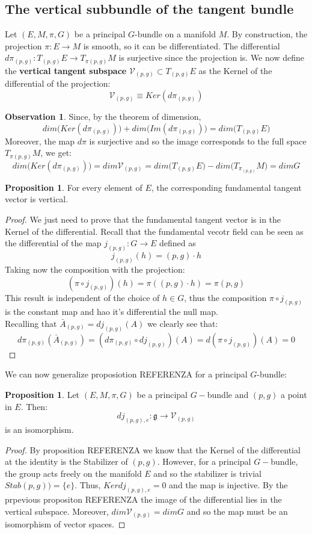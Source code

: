 \documentclass[12pt,a4paper]{report}
\theoremstyle{definition}
\theoremstyle{Theorem}
\newtheorem{Prop}[Def]{Proposition}
\theoremstyle{definition}
\theoremstyle{definition}
\newtheorem{Obs}[Def]{Observation}
\begin{document}
		\subsection{The vertical subbundle of the tangent bundle}
		Let $(E,M,\pi,G)$ be a principal $G$-bundle on a manifold $M$. By construction, the projection $\pi:E\rightarrow M$ is smooth, so it can be differentiated. The differential $d\pi_{(p,g)}:T_{(p,g)}E\rightarrow T_{\pi(p,g)}M$ is surjective since the projection is. We now define the \textbf{vertical tangent subspace} $\mathcal{V}_{(p,g)}\subset T_{(p,g)}E$ as the Kernel of the differential of the projection:
		$$\mathcal{V}_{(p,g)}\equiv Ker(d\pi_{(p,g)})$$
		\begin{Obs}
			Since, by the theorem of dimension, 
			$$dim \bigg(Ker(d\pi_{(p,g)})\bigg)+dim\bigg(Im(d\pi_{(p,g)})\bigg)=dim\bigg(T_{(p,g)}E\bigg)$$
			Moreover, the map $d\pi$ is surjective and so the image corresponds to the full space $T_{\pi(p,g)}M$, we get:
			$$dim \bigg(Ker(d\pi_{(p,g)})\bigg)=dim\mathcal{V}_{(p,g)}=dim\bigg(T_{(p,g)}E\bigg)-dim\bigg(T_{\pi_{(p,g)}}M\bigg)=dim G$$
		\end{Obs}
		\begin{Prop}
			For every element of $E$, the corresponding fundamental tangent vector is vertical.
		\end{Prop}
		\begin{proof}
			We just need to prove that the fundamental tangent vector is in the Kernel of the differential. Recall that the fundamental vecotr field can be seen as the differential of the map $j_{(p,g)}:G\rightarrow E$ defined as 
			$$j_{(p,g)}(h)=(p,g)\cdot h $$
			Taking now the composition with the projection:
			$$(\pi\circ j_{(p,g)})(h)=\pi((p,g)\cdot h)=\pi(p,g)$$
			This result is independent of the choice of $h\in G$, thus the composition $\pi\circ j_{(p,g)}$ is the constant map and hao it's differential the null map.\\
			Recalling that $\bar{A}_{(p,g)}=dj_{(p,g)}(A)$ we clearly see that:
			$$d\pi_{(p,g)}(\bar{A}_{(p,g)})=
			(d\pi_{(p,g)}\circ dj_{(p,g)})(A)=
			d(\pi\circ j_{(p,g)})(A)=0$$
		\end{proof}
		We can now generalize proposiotion REFERENZA for a principal $G$-bundle:
		\begin{Prop}
			Let $(E,M,\pi,G)$ be a principal $G-$bundle and $(p,g)$ a point in $E$. Then: 
			$$dj_{(p,g),e}:\mathfrak{g}\rightarrow \mathcal{V}_{(p,g)}$$ is an isomorphism.
		\end{Prop}
		\begin{proof}
			By proposition REFERENZA we know that the Kernel of the differential at the identity is the Stabilizer of $(p,g)$. However, for a principal $G-$bundle, the group acts freely on the manifold $E$ and so the stabilizer is trivial $Stab(p,g))=\{e\}$. Thus, $Ker dj_{(p,g),e}=0$ and the map is injective. By the prpevious propositon REFERENZA the image of the differential lies in the vertical subspace. Moreover, $dim\mathcal{V}_{(p,g)}=dim G$ and so the map must be an isomorphism of vector spaces.			
		\end{proof}
\end{document}
